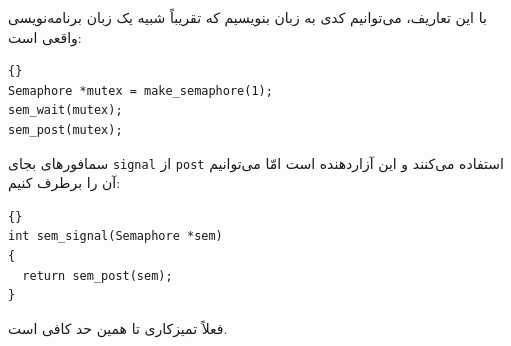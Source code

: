 \documentclass{book}
\begin{document}
    با این تعاریف، می‌توانیم کدی به زبان   بنویسیم که تقریباً شبیه یک زبان برنامه‌نویسی  واقعی است:‌

\begin{latin}
\begin{lstlisting}[title={}]{}
Semaphore *mutex = make_semaphore(1);
sem_wait(mutex);
sem_post(mutex);
\end{lstlisting}
\end{latin}

    سمافورهای  بجای {\tt signal} از  {\tt post} استفاده می‌کنند و این آزاردهنده است امّا می‌توانیم آن را برطرف کنیم:‌
    
\begin{latin}
\begin{lstlisting}[title={}]{}
int sem_signal(Semaphore *sem)
{
  return sem_post(sem);
}
\end{lstlisting}
\end{latin}

    فعلاً تمیزکاری تا همین حد کافی است. 
\end{document}
